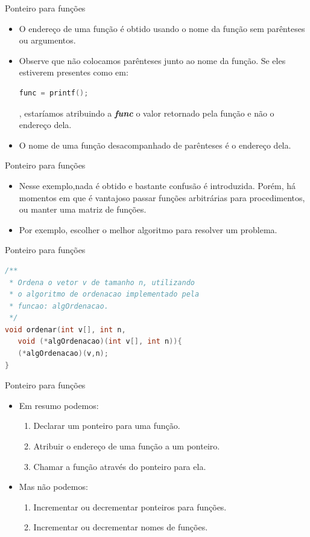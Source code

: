 \begin{frame}[fragile,c]{Ponteiro para funções}
\begin{itemize}[<+->]
  \item O endereço de uma função é obtido usando o nome da função sem parênteses ou argumentos. 
  \item Observe que não colocamos parênteses junto ao nome da função. Se eles estiverem presentes como em:  
\begin{lstlisting}[language=C]
func = printf();
\end{lstlisting}, estaríamos atribuindo a \textit{\textbf{func}} o valor retornado pela função e não o endereço dela.
  \item \alert{O nome de uma função desacompanhado de parênteses é o endereço dela.}  
\end{itemize}
\end{frame}


\begin{frame}[fragile,c]{Ponteiro para funções}  
  \begin{itemize}[<+->]
    \item Nesse exemplo,nada é obtido e bastante confusão é introduzida. Porém, há momentos em que é vantajoso passar funções arbitrárias para procedimentos, ou manter uma matriz de funções.
    \item Por exemplo, escolher o melhor algoritmo para resolver um problema.
  \end{itemize}
\end{frame}

\begin{frame}[fragile,c]{Ponteiro para funções}  
\begin{lstlisting}[language=C]
/**
 * Ordena o vetor v de tamanho n, utilizando 
 * o algoritmo de ordenacao implementado pela 
 * funcao: algOrdenacao.
 */
void ordenar(int v[], int n, 
   void (*algOrdenacao)(int v[], int n)){   
   (*algOrdenacao)(v,n);     
}
\end{lstlisting}  
\end{frame}

\begin{frame}[fragile,c]{Ponteiro para funções}  
\begin{itemize}
  \item Em resumo podemos:  
    \begin{enumerate}
      \item Declarar um ponteiro para uma função.
      \item Atribuir o endereço de uma função a um ponteiro.
      \item Chamar a função através do ponteiro para ela.
    \end{enumerate}
  \item Mas não podemos:  
    \begin{enumerate}
      \item Incrementar ou decrementar ponteiros para funções.
      \item Incrementar ou decrementar nomes de funções.
    \end{enumerate} 
\end{itemize}
\end{frame}


